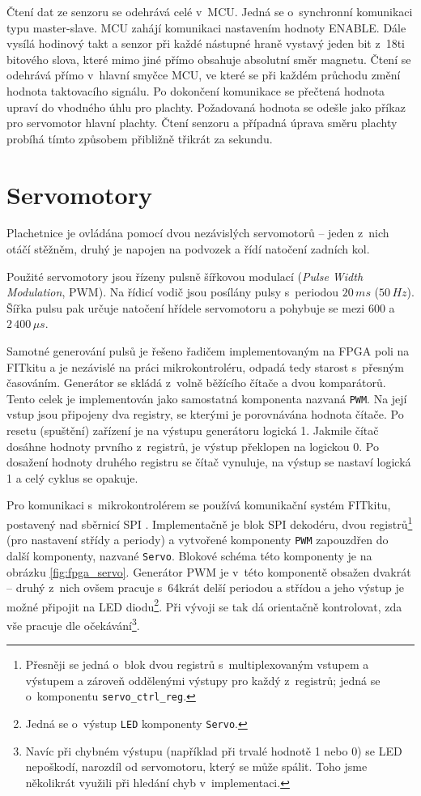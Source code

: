 Čtení dat ze senzoru se odehrává celé v~MCU. Jedná se o~synchronní komunikaci typu master-slave. MCU zahájí komunikaci nastavením hodnoty ENABLE. Dále vysílá hodinový takt a senzor při každé nástupné hraně vystavý jeden bit z~18ti bitového slova, které mimo jiné přímo obsahuje absolutní směr magnetu. Čtení se odehrává přímo v~hlavní smyčce MCU, ve které se při každém průchodu změní hodnota taktovacího signálu. Po dokončení komunikace se přečtená hodnota upraví do vhodného úhlu pro plachty. Požadovaná hodnota se odešle jako příkaz pro servomotor hlavní plachty. Čtení senzoru a případná úprava směru plachty probíhá tímto způsobem přibližně třikrát za sekundu.



\section{Servomotory}
Plachetnice je ovládána pomocí dvou nezávislých servomotorů -- jeden z~nich
otáčí stěžněm, druhý je napojen na podvozek a řídí natočení zadních kol.

Použité servomotory jsou řízeny pulsně šířkovou modulací (\emph{Pulse Width
Modulation}, PWM). Na řídicí vodič jsou posílány pulsy s~periodou $20\,ms$
($50\,Hz$). Šířka pulsu pak určuje natočení hřídele servomotoru a pohybuje se
mezi $600$ a $2\,400\,\mu{}s$. \cite{modelarska_stranka_dohledam_doma}

Samotné generování pulsů je řešeno řadičem implementovaným na FPGA poli na
FITkitu a je nezávislé na práci mikrokontroléru, odpadá tedy starost s~přesným
časováním. Generátor se skládá z~volně běžícího čítače a dvou komparátorů. Tento
celek je implementován jako samostatná komponenta nazvaná \texttt{PWM}. Na její
vstup jsou připojeny dva registry, se kterými je porovnávána hodnota čítače. Po
resetu (spuštění) zařízení je na výstupu generátoru logická 1. Jakmile čítač
dosáhne hodnoty prvního z~registrů, je výstup překlopen na logickou 0. Po
dosažení hodnoty druhého registru se čítač vynuluje, na výstup se nastaví
logická 1 a celý cyklus se opakuje.

Pro komunikaci s~mikrokontrolérem se používá komunikační systém FITkitu,
postavený nad sběrnicí SPI \cite{fitkit_communication}. Implementačně je blok
SPI dekodéru, dvou registrů\footnote{Přesněji se jedná o~blok dvou registrů
s~multiplexovaným vstupem a výstupem a zároveň oddělenými výstupy pro každý
z~registrů; jedná se o~komponentu \texttt{servo\_ctrl\_reg}.} (pro nastavení
střídy a periody) a vytvořené komponenty \texttt{PWM} zapouzdřen do další
komponenty, nazvané \texttt{Servo}. Blokové schéma této komponenty je na obrázku
\ref{fig:fpga_servo}. Generátor PWM je v~této komponentě obsažen dvakrát --
druhý z~nich ovšem pracuje s~64krát delší periodou a střídou a jeho výstup je
možné připojit na LED diodu\footnote{Jedná se o~výstup \texttt{LED} komponenty
\texttt{Servo}.}. Při vývoji se tak dá orientačně kontrolovat, zda vše pracuje
dle očekávání\footnote{Navíc při chybném výstupu (například při trvalé hodnotě 1
nebo 0) se LED nepoškodí, narozdíl od servomotoru, který se může spálit. Toho
jsme několikrát využili při hledání chyb v~implementaci.}.

